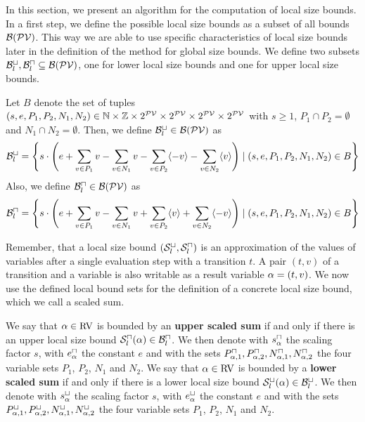In this section, we present an algorithm for the computation of local size bounds.
In a first step, we define the possible local size bounds as a subset of all bounds $\mathcal{B}(\mathcal{PV})$.
This way we are able to use specific characteristics of local size bounds later in the definition of the method for global size bounds.
We define two subsets $\mathcal{B}^\sqcup_l, \mathcal{B}^\sqcap_l \subseteq \mathcal{B}(\mathcal{PV})$, one for lower local size bounds and one for upper local size bounds.

\begin{definition}
  Let $B$ denote the set of tuples $(s,e,P_1,P_2,N_1,N_2) \in \mathbb{N} \times \mathbb{Z} \times 2^{\mathcal{PV}} \times 2^{\mathcal{PV}} \times 2^{\mathcal{PV}} \times 2^{\mathcal{PV}}$ with $s \geq 1$, $P_1 \cap P_2 = \emptyset$ and $N_1 \cap N_2 = \emptyset$.
  Then, we define $\mathcal{B}^\sqcup_l \in \mathcal{B}(\mathcal{PV})$ as 
  \[ \mathcal{B}^\sqcup_l = \left\{
    s \cdot \left(
        e
      + \sum_{v \in P_1} v
      - \sum_{v \in N_1} v
      - \sum_{v \in P_2} \langle-v\rangle
      - \sum_{v \in N_2} \langle v\rangle
      \right) \mid (s,e,P_1,P_2,N_1,N_2) \in B \right\} \]
  Also, we define $\mathcal{B}^\sqcap_l \in \mathcal{B}(\mathcal{PV})$ as 
  \[ \mathcal{B}^\sqcap_l = \left\{
    s \cdot \left(
        e
      + \sum_{v \in P_1} v
      - \sum_{v \in N_1} v
      + \sum_{v \in P_2} \langle v\rangle
      + \sum_{v \in N_2} \langle-v\rangle
      \right) \mid (s,e,P_1,P_2,N_1,N_2) \in B \right\} \]
\end{definition}

Remember, that a local size bound ${({\mathcal{S}^\sqcup_l}, {\mathcal{S}^\sqcap_l})}$ is an approximation of the values of variables after a single evaluation step with a transition $t$.
A pair $(t,v)$ of a transition and a variable is also writable as a result variable $\alpha = (t,v)$.
We now use the defined local bound sets for the definition of a concrete local size bound, which we call a scaled sum.

\begin{definition}
  We say that $\alpha \in \text{RV}$ is bounded by an \textbf{upper scaled sum} if and only if there is an upper local size bound ${\mathcal{S}^\sqcap_l}(\alpha) \in \mathcal{B}^\sqcap_l$.
  We then denote with $s^\sqcap_\alpha$ the scaling factor $s$, with $e^\sqcap_\alpha$ the constant $e$ and with the sets $P_{\alpha,1}^\sqcap, P_{\alpha,2}^\sqcap, N_{\alpha,1}^\sqcap, N_{\alpha,2}^\sqcap$ the four variable sets $P_1$, $P_2$, $N_1$ and $N_2$.
  We say that $\alpha \in \text{RV}$ is bounded by a \textbf{lower scaled sum} if and only if there is a lower local size bound ${\mathcal{S}^\sqcup_l}(\alpha) \in \mathcal{B}^\sqcup_l$.
  We then denote with $s^\sqcup_\alpha$ the scaling factor $s$, with $e^\sqcup_\alpha$ the constant $e$ and with the sets $P_{\alpha,1}^\sqcup, P_{\alpha,2}^\sqcup, N_{\alpha,1}^\sqcup, N_{\alpha,2}^\sqcup$ the four variable sets $P_1$, $P_2$, $N_1$ and $N_2$.
\end{definition}

